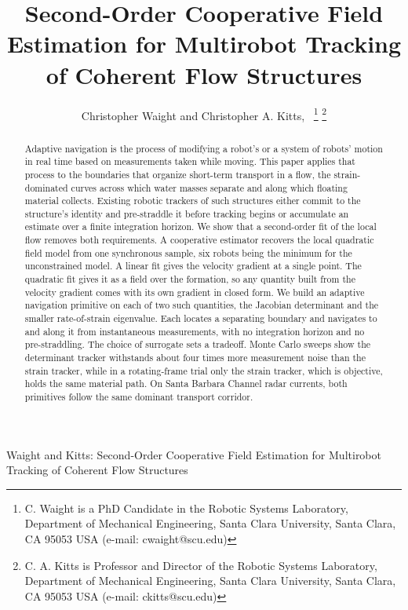 \documentclass[lettersize,journal]{IEEEtran}
\begin{document}
\title{Second-Order Cooperative Field Estimation for
Multirobot Tracking of Coherent Flow Structures}

\author{Christopher Waight and Christopher A. Kitts,~
\thanks{C. Waight is a PhD Candidate in the Robotic Systems Laboratory, Department of Mechanical Engineering, Santa Clara University, Santa Clara, CA 95053 USA (e-mail: cwaight@scu.edu)}
\thanks{C. A. Kitts is Professor and Director of the Robotic Systems Laboratory, Department of Mechanical Engineering, Santa Clara University, Santa Clara, CA 95053 USA (e-mail: ckitts@scu.edu)}
}
%
{Waight and Kitts: Second-Order Cooperative Field Estimation for Multirobot Tracking of Coherent Flow Structures}

\maketitle

\begin{abstract}
Adaptive navigation is the process of modifying a robot's or a system of robots' motion in
real time based on measurements taken while moving. This paper applies
that process to the boundaries that organize short-term transport in a
flow, the strain-dominated curves across which water masses separate
and along which floating material collects. Existing robotic trackers
of such structures either commit to the structure's identity and pre-straddle it before
tracking begins or accumulate an estimate over a finite integration
horizon. We show that a second-order fit of the local flow removes both
requirements. A cooperative estimator recovers the local quadratic field
model from one synchronous sample, six robots being the minimum for the
unconstrained model. A linear fit gives the velocity gradient at a single
point. The quadratic fit gives it as a field over the formation, so any
quantity built from the velocity gradient comes with its own gradient in
closed form. We build an adaptive navigation primitive on each of two such
quantities, the Jacobian determinant and the smaller rate-of-strain
eigenvalue. Each locates a separating boundary and navigates to and along
it from instantaneous measurements, with no integration horizon and no
pre-straddling. The choice of surrogate sets a tradeoff. Monte Carlo
sweeps show the determinant tracker withstands about four times
more measurement noise than the strain tracker, while in a rotating-frame trial only the strain
tracker, which is objective, holds the same material path. On Santa
Barbara Channel radar currents, both primitives follow the same dominant
transport corridor.

\end{abstract}
\end{document}
